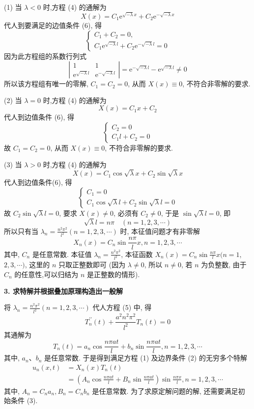 (1) 当 $ \lambda<0 $ 时,方程 (4) 的通解为
$$
X(x)=C_{1} \mathrm{e}^{\sqrt{-\lambda} x}+C_{2} \mathrm{e}^{-\sqrt{-\lambda} x}
$$
代人到要满足的边值条件 (6), 得
$$
\left\{\begin{array}{l}
C_{1}+C_{2}=0, \\
C_{1} \mathrm{e}^{\sqrt{-\lambda} l}+C_{2} \mathrm{e}^{-\sqrt{-\lambda} l}=0
\end{array}\right.
$$
因为此方程组的系数行列式
$$
\left|\begin{array}{cc}
1 & 1 \\
\mathrm{e}^{\sqrt{-\lambda} l} & \mathrm{e}^{-\sqrt{-\lambda} l}
\end{array}\right|=\mathrm{e}^{-\sqrt{-\lambda} l}-\mathrm{e}^{\sqrt{-\lambda} l} \neq 0
$$
所以该方程组有唯一的零解, $ C_{1}=C_{2}=0 $, 从而 $ X(x) \equiv 0 $, 不符合非零解的要求.

(2) 当 $ \lambda=0 $ 时,方程 (4) 的通解为
$$
X(x)=C_{1} x+C_{2}
$$
代人到边值条件 (6), 得
$$
\left\{\begin{array}{l}
C_{2}=0 \\
C_{1} l+C_{2}=0
\end{array}\right.
$$
故 $ C_{1}=C_{2}=0 $, 从而 $ X(x) \equiv 0 $, 不符合非零解的要求.

(3) 当 $ \lambda>0 $ 时,方程 (4) 的通解为
$$
X(x)=C_{1} \cos \sqrt{\lambda} x+C_{2} \sin \sqrt{\lambda} x
$$
代人到边值条件(6), 得
$$
\left\{\begin{array}{l}
C_{1}=0 \\
C_{1} \cos \sqrt{\lambda} l+C_{2} \sin \sqrt{\lambda} l=0
\end{array}\right.
$$
故 $ C_{2} \sin \sqrt{\lambda} l=0 $, 要求 $ X(x) \neq 0 $, 必须有 $ C_{2} \neq 0 $, 于是 $ \sin \sqrt{\lambda} l=0 $, 即
$$
\sqrt{\lambda} l=n \pi \quad(n=1,2,3, \cdots)
$$
所以只有当 $ \lambda_{n}=\frac{n^{2} \pi^{2}}{l^{2}}(n=1,2,3, \cdots) $ 时, 本征值问题才有非零解
$$
X_{n}(x)=C_{n} \sin \frac{n \pi}{l} x, n=1,2,3, \cdots
$$
其中, $ C_{n} $ 是任意常数. 本征值 $ \lambda_{n}=\frac{n^{2} \pi^{2}}{l^{2}} $, 本征函数 $ X_{n}(x)=C_{n} \sin \frac{n \pi}{l} x(n=1 $, $ 2,3, \cdots) $, 这里的 $ n $ 只取正整数即可 (因为 $ \lambda \neq 0 $, 所以 $ n \neq 0 $, 若 $ n $ 为负整数, 由于 $ C_{n} $ 的任意性,可以归结为 $ n $ 是正整数的情形).

\textbf{3. 求特解并根据叠加原理构造出一般解}

将 $ \lambda_{n}=\frac{n^{2} \pi^{2}}{l^{2}}(n=1,2,3, \cdots) $ 代人方程 (5) 中, 得
$$
T_{n}^{\prime \prime}(t)+\frac{a^{2} n^{2} \pi^{2}}{l^{2}} T_{n}(t)=0
$$
其通解为
$$
T_{n}(t)=a_{n} \cos \frac{n \pi a t}{l}+b_{n} \sin \frac{n \pi a t}{l}, n=1,2,3, \cdots
$$
其中, $ a_{n} 、 b_{n} $ 是任意常数. 于是得到满足方程 (1) 及边界条件 (2) 的无穷多个特解
$$
\begin{aligned}
u_{n}(x, t) & =X_{n}(x) T_{n}(t) \\
& =\left(A_{n} \cos \frac{n \pi a t}{l}+B_{n} \sin \frac{n \pi a t}{l}\right) \sin \frac{n \pi x}{l}, n=1,2,3, \cdots
\end{aligned}
$$
其中, $ A_{n}=C_{n} a_{n}, B_{n}=C_{n} b_{n} $ 是任意常数. 为了求原定解问题的解, 还需要满足初始条件 (3).

